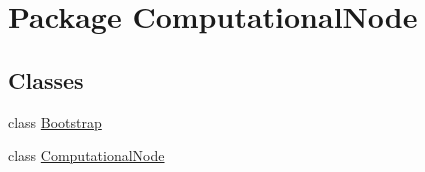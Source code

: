 \hypertarget{namespace_computational_node}{}\section{Package Computational\+Node}
\label{namespace_computational_node}
\subsection*{Classes}
\begin{DoxyCompactItemize}
\item 
class \hyperlink{class_computational_node_1_1_bootstrap}{Bootstrap}
\item 
class \hyperlink{class_computational_node_1_1_computational_node}{Computational\+Node}
\end{DoxyCompactItemize}
